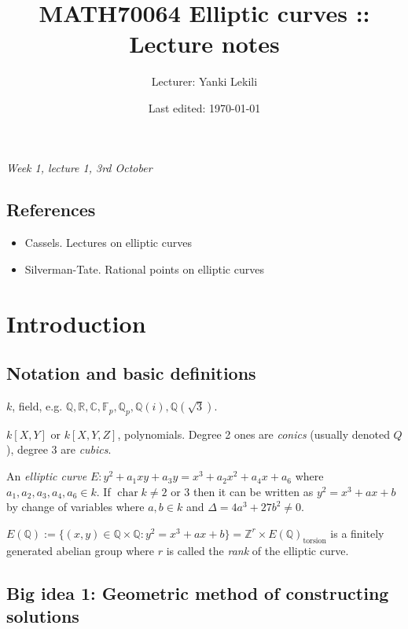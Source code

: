 \documentclass{article}
\title{MATH70064 Elliptic curves :: Lecture notes}
\author{Lecturer: Yanki Lekili}
\date{Last edited: \today}
\newcommand{\F}{\mathbb{F}}
\newcommand{\Z}{\mathbb{Z}}
\newcommand{\Q}{\mathbb{Q}}
\newcommand{\R}{\mathbb{R}}
\newcommand{\C}{\mathbb{C}}
\newcommand{\Char}{\operatorname{char}}
\theoremstyle{definition}
\begin{document}
\maketitle
\thispagestyle{empty}

\tableofcontents
\thispagestyle{empty}
\newpage
\setcounter{page}{1}

\begin{flushright}
\textit{Week 1, lecture 1, 3rd October}
\end{flushright}

\subsection*{References}
\begin{itemize}
\item Cassels. Lectures on elliptic curves
\item Silverman-Tate. Rational points on elliptic curves
\end{itemize}

\section{Introduction}
\subsection{Notation and basic definitions}
$k$, field, e.g. $\Q, \R, \C, \F_p, \Q_p, \Q(i), \Q(\sqrt 3)$.

$k[X,Y]$ or $k[X,Y,Z]$, polynomials. Degree 2 ones are \textit{conics} (usually denoted $Q$), degree 3 are \textit{cubics}.

An \textit{elliptic curve} $E: y^2+a_1xy+a_3y=x^3+a_2x^2+a_4x+a_6$ where $a_1,a_2,a_3,a_4,a_6\in k$. If $\Char k\neq 2$ or 3 then it can be written as $y^2=x^3+ax+b$ by change of variables where $a,b\in k$ and $\Delta=4a^3+27b^2\neq 0$.

$E(\Q):=\{(x,y)\in \Q\times \Q:y^2=x^3+ax+b\}=\Z^r\times E(\Q)_{\text{torsion}}$ is a finitely generated abelian group where $r$ is called the \textit{rank} of the elliptic curve.

\subsection{Big idea 1: Geometric method of constructing solutions}
\end{document}
